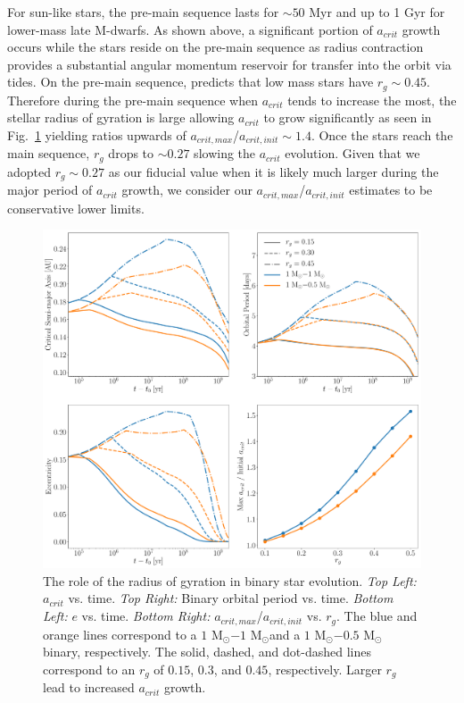 For sun-like stars, the pre-main sequence lasts for ${\sim} 50$ Myr and up to 1 Gyr for lower-mass late M-dwarfs.  As shown above, a significant portion of  $a_{crit}$ growth occurs while the stars reside on the pre-main sequence as radius contraction provides a substantial angular momentum reservoir for transfer into the orbit via tides.  On the pre-main sequence, \citet{Baraffe2015} predicts that low mass stars have $r_{g}{\sim}0.45$.  Therefore during the pre-main sequence when $a_{crit}$ tends to increase the most, the stellar radius of gyration is large allowing $a_{crit}$ to grow significantly as seen in Fig.~\ref{STEEP:fig:var_rg} yielding ratios upwards of $a_{crit,max}$/$a_{crit,init} {\sim} 1.4$.  Once the stars reach the main sequence, $r_{g}$ drops to ${\sim}0.27$ slowing the $a_{crit}$ evolution.  Given that we adopted $r_{g}{\sim}0.27$ as our fiducial value when it is likely much larger during the major period of $a_{crit}$ growth, we consider our $a_{crit,max}$/$a_{crit,init}$ estimates to be conservative lower limits. 

\begin{figure}
	\includegraphics[width=\columnwidth]{var_rg.pdf}
    \caption{The role of the radius of gyration in binary star evolution. {\it Top Left:} $a_{crit}$ vs. time.  {\it Top Right:} Binary orbital period vs. time. {\it Bottom Left:} $e$ vs. time. {\it Bottom Right:} $a_{crit,max}$/$a_{crit,init}$ vs. $r_g$.  The blue and orange lines correspond to a $1$ M$_{\odot}$$-1$ M$_{\odot}$and a $1$ M$_{\odot}$$-0.5$ M$_{\odot}$ binary, respectively.  The solid, dashed, and dot-dashed lines correspond to an $r_g$ of $0.15$, $0.3$, and $0.45$, respectively.  Larger $r_g$ lead to increased $a_{crit}$ growth.}
    \label{STEEP:fig:var_rg}
\end{figure}

